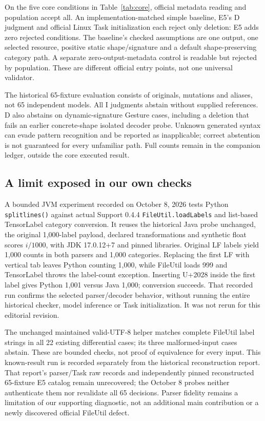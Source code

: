 \documentclass[10pt,conference]{IEEEtran}
\newcommand{\code}[1]{\texttt{#1}}
\begin{document}
On the five core conditions in Table~\ref{tab:core}, official metadata reading and population accept all. An implementation-matched simple baseline, E5's D judgment and official Linux Task initialization each reject only deletion: E5 adds zero rejected conditions. The baseline's checked assumptions are one output, one selected resource, positive static shape/signature and a default shape-preserving category path. A separate zero-output-metadata control is readable but rejected by population. These are different official entry points, not one universal validator.

The historical 65-fixture evaluation consists of originals, mutations and aliases, not 65 independent models. All I judgments abstain without supplied references. D also abstains on dynamic-signature Gesture cases, including a deletion that fails an earlier concrete-shape isolated decoder probe. Unknown generated syntax can evade pattern recognition and be reported as inapplicable; correct abstention is not guaranteed for every unfamiliar path. Full counts remain in the companion ledger, outside the core executed result.

\subsection{A limit exposed in our own checks}
A bounded JVM experiment recorded on October 8, 2026 tests Python \code{splitlines()} against actual Support 0.4.4 \code{FileUtil.loadLabels} and list-based TensorLabel category conversion. It reuses the historical Java probe unchanged, the original 1,000-label payload, declared transformations and synthetic float scores $i/1000$, with JDK 17.0.12+7 and pinned libraries. Original LF labels yield 1,000 counts in both parsers and 1,000 categories. Replacing the first LF with vertical tab leaves Python counting 1,000, while FileUtil loads 999 and TensorLabel throws the label-count exception. Inserting U+2028 inside the first label gives Python 1,001 versus Java 1,000; conversion succeeds. That recorded run confirms the selected parser/decoder behavior, without running the entire historical checker, model inference or Task initialization. It was not rerun for this editorial revision.

The unchanged maintained valid-UTF-8 helper matches complete FileUtil label strings in all 22 existing differential cases; its three malformed-input cases abstain. These are bounded checks, not proof of equivalence for every input. This known-result run is recorded separately from the historical reconstruction report. That report's parser/Task raw records and independently pinned reconstructed 65-fixture E5 catalog remain unrecovered; the October 8 probes neither authenticate them nor revalidate all 65 decisions. Parser fidelity remains a limitation of our supporting diagnostic, not an additional main contribution or a newly discovered official FileUtil defect.
\end{document}
